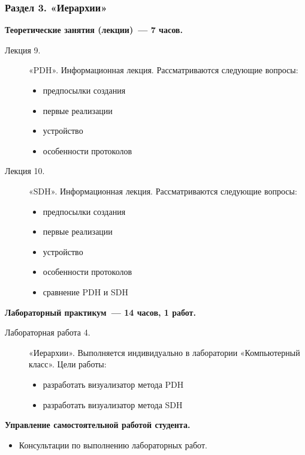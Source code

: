 \subsubsection{Раздел 3. «Иерархии»}

{\parindent0pt

\textbf{Теоретические занятия (лекции)~— 7 часов.}
\begin{description}
\item[Лекция 9.] «PDH». Информационная лекция. Рассматриваются следующие вопросы: \begin{itemize}
\item предпосылки создания\item первые реализации\item устройство\item особенности протоколов
\end{itemize}\item[Лекция 10.] «SDH». Информационная лекция. Рассматриваются следующие вопросы: \begin{itemize}
\item предпосылки создания\item первые реализации\item устройство\item особенности протоколов\item сравнение PDH и SDH
\end{itemize}
\end{description}




\textbf{Лабораторный практикум~— 14 часов, 1 работ.}
\begin{description}
\item[Лабораторная работа 4.] «Иерархии». Выполняется индивидуально в лаборатории «Компьютерный класс». Цели работы: \begin{itemize}
\item разработать визуализатор метода PDH\item разработать визуализатор метода SDH
\end{itemize}
\end{description}

\textbf{Управление самостоятельной работой студента.}
\begin{itemize}
\item Консультации по выполнению лабораторных работ.
\end{itemize}
}


